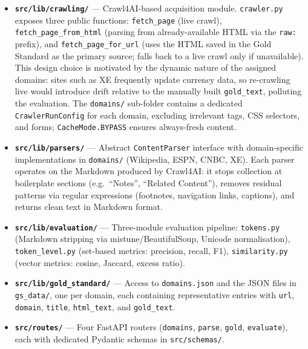 \documentclass[11pt]{article}
\begin{document}
\begin{itemize}
  \item \textbf{\texttt{src/lib/crawling/}} — Crawl4AI-based acquisition module. \texttt{crawler.py} exposes three public functions: \texttt{fetch\_page} (live crawl), \texttt{fetch\_page\_from\_html} (parsing from already-available HTML via the \texttt{raw:} prefix), and \texttt{fetch\_page\_for\_url} (uses the HTML saved in the Gold Standard as the primary source; falls back to a live crawl only if unavailable). This design choice is motivated by the dynamic nature of the assigned domains: sites such as XE frequently update currency data, so re-crawling live would introduce drift relative to the manually built \texttt{gold\_text}, polluting the evaluation. The \texttt{domains/} sub-folder contains a dedicated \texttt{CrawlerRunConfig} for each domain, excluding irrelevant tags, CSS selectors, and forms; \texttt{CacheMode.BYPASS} ensures always-fresh content.

  \item \textbf{\texttt{src/lib/parsers/}} — Abstract \texttt{ContentParser} interface with domain-specific implementations in \texttt{domains/} (Wikipedia, ESPN, CNBC, XE). Each parser operates on the Markdown produced by Crawl4AI: it stops collection at boilerplate sections (e.g.\ ``Notes'', ``Related Content''), removes residual patterns via regular expressions (footnotes, navigation links, captions), and returns clean text in Markdown format.

  \item \textbf{\texttt{src/lib/evaluation/}} — Three-module evaluation pipeline: \texttt{tokens.py} (Markdown stripping via mistune/BeautifulSoup, Unicode normalisation), \texttt{token\_level.py} (set-based metrics: precision, recall, F1), \texttt{similarity.py} (vector metrics: cosine, Jaccard, excess ratio).

  \item \textbf{\texttt{src/lib/gold\_standard/}} — Access to \texttt{domains.json} and the JSON files in \texttt{gs\_data/}, one per domain, each containing representative entries with \texttt{url}, \texttt{domain}, \texttt{title}, \texttt{html\_text}, and \texttt{gold\_text}.

  \item \textbf{\texttt{src/routes/}} — Four FastAPI routers (\texttt{domains}, \texttt{parse}, \texttt{gold}, \texttt{evaluate}), each with dedicated Pydantic schemas in \texttt{src/schemas/}.
\end{itemize}
\end{document}

